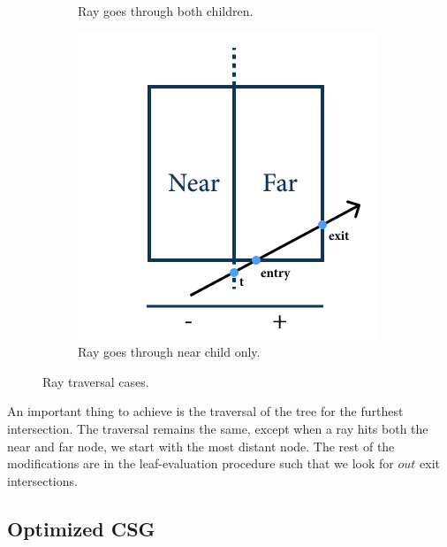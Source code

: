 \documentclass[a4paper,11pt,oneside]{article}
\begin{document}
\begin{figure}[ht]
\begin{subfigure}[b]{0.3\textwidth}
		\caption{Ray goes through both children.}
		\label{sec4.3:both-children}
	\end{subfigure}
	\hfill
	\begin{subfigure}[b]{0.3\textwidth}
		\centering
		\includegraphics[width=\textwidth]{section4/4.3/far-intersection.png}
		\caption{Ray goes through near child only.}
		\label{sec4.3:far-child}
	\end{subfigure}
	\hfill
	\caption{Ray traversal cases.}
	\label{sec4.3:ray-traversal-cases}
\end{figure}


An important thing to achieve is the traversal of the tree for the furthest intersection. The traversal remains the same, except when a ray hits both the near and far node, we start with the most distant node. The rest of the modifications are in the leaf-evaluation procedure such that we look for $out$ exit intersections. 

\subsection{Optimized CSG}
\end{document}
